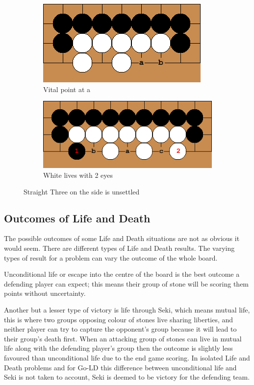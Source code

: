\documentclass{l4proj}
\begin{document}
\begin{figure}[!ht]
\centering
\begin{subfigure}[b]{0.4\textwidth}
\includegraphics[width=\textwidth]{LD/5a.png}
\caption{Vital point at a}
\label{fig:LD-5a}
\end{subfigure}\qquad
\begin{subfigure}[b]{0.5\textwidth}
\includegraphics[width=\textwidth]{LD/5b.png}
\caption{White lives with 2 eyes}
\label{fig:LD-5b}
\end{subfigure}
\caption{Straight Three on the side is unsettled}
\label{fig:LD-5}
\end{figure}


\subsection{Outcomes of Life and Death}
The possible outcomes of some Life and Death situations are not as obvious it would seem. There are different types of Life and Death results. The varying types of result for a problem can vary the outcome of the whole board.

Unconditional life or escape into the centre of the board is the best outcome a defending player can expect; this means their group of stone will be scoring them points without uncertainty.

Another but a lesser type of victory is life through Seki, which means mutual life, this is where two groups opposing colour of stones live sharing liberties, and neither player can try to capture the opponent’s group because it will lead to their group’s death first. When an attacking group of stones can live in mutual life along with the defending player’s group then the outcome is slightly less favoured than unconditional life due to the end game scoring. In isolated Life and Death problems and for Go-LD this difference between unconditional life and Seki is not taken to account, Seki is deemed to be victory for the defending team.
\end{document}
